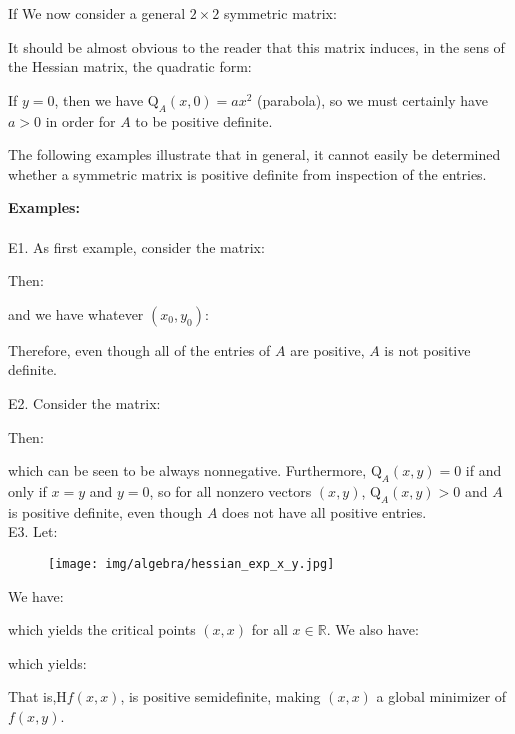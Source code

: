 	If We now consider a general $2\times 2$ symmetric matrix:
	
	It should be almost obvious to the reader that this matrix induces, in the sens of the Hessian matrix, the quadratic form:
	
	If $y = 0$, then we have $\mathrm{Q}_A(x,0) = ax^2$ (parabola), so we must certainly have $a > 0$ in order for $A$ to be positive definite.
	
	The following examples illustrate that in general, it cannot easily be determined whether a symmetric matrix is positive definite from inspection of the entries.
	\begin{tcolorbox}[colframe=black,colback=white,sharp corners]
	\textbf{{\Large {}}Examples:}\\\\
	E1. As first example, consider the matrix:
	
	Then:
	
	and we have whatever $(x_0,y_0)$:
	
	Therefore, even though all of the entries of $A$ are positive, $A$ is not positive definite.
	\end{tcolorbox}
	\begin{tcolorbox}[colframe=black,colback=white,sharp corners]
	E2. Consider the matrix:
	
	Then:
	
	which can be seen to be always nonnegative. Furthermore, $ \mathrm{Q}_A(x,y) =0 $ if and only if $x = y$ and $y =0$, so for all nonzero vectors $(x,y)$, $ \mathrm{Q}_A(x,y) >0 $ and $A$ is positive definite, even though $A$ does not have all positive entries.\\
	
	E3. Let:
	
	\begin{figure}[H]
		\centering
		\texttt{[image: img/algebra/hessian\_exp\_x\_y.jpg]}
	\end{figure}
	We have:
	
	which yields the critical points $(x, x)$ for all $x \in \mathds{R}$. We also have:
	
	which yields:
	
	That is,$\mathrm{H}f(x,x)$, is positive semidefinite, making $(x,x)$ a global minimizer of $f(x,y)$.
	\end{tcolorbox}
	
